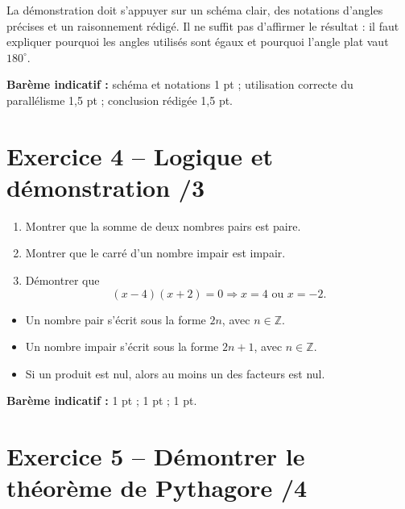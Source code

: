 \documentclass[11pt,a4paper]{article}
\begin{document}
\begin{tcolorbox}[title=Attendus]
La démonstration doit s'appuyer sur un schéma clair, des notations d'angles précises et un raisonnement rédigé. Il ne suffit pas d'affirmer le résultat : il faut expliquer pourquoi les angles utilisés sont égaux et pourquoi l'angle plat vaut \(180^\circ\).
\end{tcolorbox}

\vspace{0.6em}
\textbf{Barème indicatif :} schéma et notations 1 pt ; utilisation correcte du parallélisme 1,5 pt ; conclusion rédigée 1,5 pt.

\section*{Exercice 4 -- Logique et démonstration \hfill /3}

\begin{enumerate}[label=\textbf{\arabic*.}, leftmargin=1.2cm]
    \item Montrer que la somme de deux nombres pairs est paire.
    \item Montrer que le carré d'un nombre impair est impair.
    \item Démontrer que
    \[
    (x-4)(x+2)=0 \Longrightarrow x=4 \text{ ou } x=-2.
    \]
\end{enumerate}

\begin{tcolorbox}[title=Rappels utiles]
\begin{itemize}[leftmargin=1.2cm]
    \item Un nombre pair s'écrit sous la forme \(2n\), avec \(n\in\mathbb{Z}\).
    \item Un nombre impair s'écrit sous la forme \(2n+1\), avec \(n\in\mathbb{Z}\).
    \item Si un produit est nul, alors au moins un des facteurs est nul.
\end{itemize}
\end{tcolorbox}

\vspace{0.6em}
\textbf{Barème indicatif :} 1 pt ; 1 pt ; 1 pt.

\section*{Exercice 5 -- Démontrer le théorème de Pythagore \hfill /4}
\end{document}

